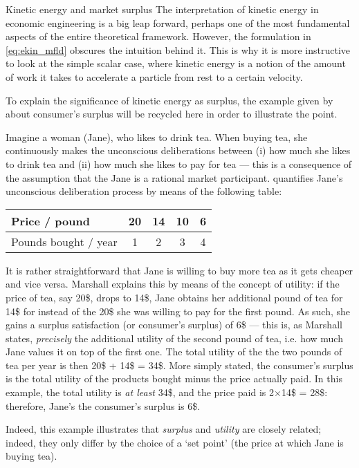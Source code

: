 \begin{econ}{Kinetic energy and market surplus}
    The interpretation of kinetic energy in economic engineering is a big leap forward, perhaps one of the most fundamental aspects of the entire theoretical framework. However, the formulation in \cref{eq:ekin_mfld} obscures the intuition behind it. This is why it is more instructive to look at the simple scalar case, where kinetic energy is a notion of the amount of work it takes to accelerate a particle from rest to a certain velocity.

    To explain the significance of kinetic energy as surplus, the example given by \citet[chap.~6]{Marshall1920} about consumer's surplus will be recycled here in order to illustrate the point.

    Imagine a woman (Jane), who likes to drink tea. When buying tea, she continuously makes the unconscious deliberations between (i) how much she likes to drink tea and (ii) how much she likes to pay for tea --- this is a consequence of the assumption that the Jane is a rational market participant. \citeauthor{Marshall1920} quantifies Jane's unconscious deliberation process by means of the following table:
    \begin{center}
        \begin{tabular}{lcccc}
            Price / pound & 20 & 14 & 10 & 6 \\
            \midrule
            Pounds bought / year & 1 & 2 & 3 & 4 \\
        \end{tabular}
    \end{center}
    It is rather straightforward that Jane is willing to buy more tea as it gets cheaper and vice versa. Marshall explains this by means of the concept of utility: if the price of tea, say 20\$, drops to 14\$, Jane obtains her additional pound of tea for 14\$ for instead of the 20\$ she was willing to pay for the first pound. As such, she gains a surplus satisfaction (or consumer's surplus) of 6\$ --- this is, as Marshall states, \emph{precisely} the additional utility of the second pound of tea, i.e. how much Jane values it on top of the first one. The total utility of the the two pounds of tea per year is then 20\$ +  14\$ = 34\$. More simply stated, the consumer's surplus is the total utility of the products bought minus the price actually paid. In this example, the total utility is \emph{at least} 34\$, and the price paid is 2$\times$14\$ = 28\$: therefore, Jane's the consumer's surplus is 6\$. 
    \begin{center}
        
    \end{center}
    Indeed, this example illustrates that \emph{surplus} and \emph{utility} are closely related; indeed, they only differ by the choice of a `set point' (the price at which Jane is buying tea). 


\end{econ}
